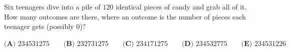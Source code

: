 Six teenagers dive into a pile of $120$ identical pieces of candy and grab all of it. How many outcomes are there, where an outcome is the number of pieces each teenager gets (possibly $0$)?

$\textbf{(A) }234531275\qquad\textbf{(B) }232731275\qquad\textbf{(C) }234171275\qquad\textbf{(D) }234532775\qquad\textbf{(E) }234531226$
